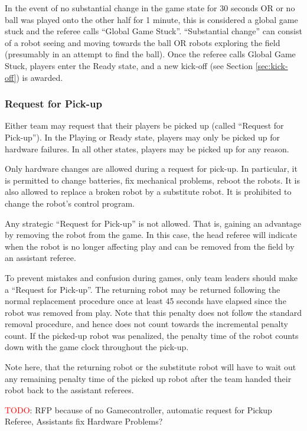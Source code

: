 In the event of no substantial change in the game state for 30 seconds OR or no ball was played onto the other half for 1 minute, this is considered a global game stuck and the referee calls ``Global Game Stuck''. ``Substantial change'' can consist of a robot seeing and moving towards the ball OR robots exploring the field (presumably in an attempt to find the ball). Once the referee calls Global Game Stuck, players enter the Ready state, and a new kick-off (see Section \ref{sec:kick-off}) is awarded.

\subsubsection{Request for Pick-up}
\label{sec:request_for_pickup}

Either team may request that their players be picked up (called ``Request for Pick-up'').
In the Playing or Ready state, players may only be picked up for hardware failures.
In all other states, players may be picked up for any reason.

Only hardware changes are allowed during a request for pick-up. In particular,
it is permitted to change batteries, fix mechanical problems, reboot the robots.
It is also allowed to replace a broken robot by a substitute robot.
It is prohibited to change the robot's control program.

Any strategic ``Request for Pick-up'' is not allowed.
That is, gaining an advantage by removing the robot from the game.
In this case, the head referee will indicate when the robot is no longer affecting play and can be removed from the field by an assistant referee.

To prevent mistakes and confusion during games, only team leaders should make a ``Request for Pick-up''.
The returning robot may be returned following the normal replacement procedure once at least 45 seconds have elapsed since the robot was removed from play.
Note that this penalty does not follow the standard removal procedure, and hence does not count towards the incremental penalty count.
If the picked-up robot was penalized, the penalty time of the robot counts down with the game clock throughout the pick-up.

Note here, that the returning robot or the substitute robot will have to wait out any remaining penalty time of the picked up robot after the team handed their robot back to the assistant referees.

\textcolor{red}{TODO}: RFP because of no Gamecontroller, automatic request for Pickup Referee, Assistants fix Hardware Problems?

